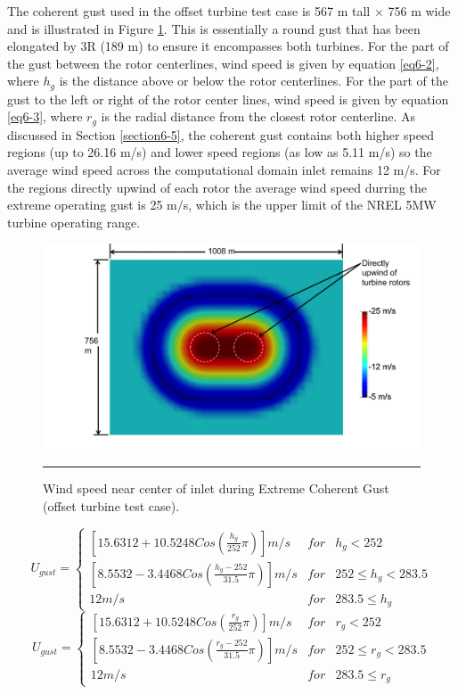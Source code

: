 The coherent gust used in the offset turbine test case is 567 m tall $\times$ 756 m wide and is illustrated in Figure \ref{fig6-13}. This is essentially a round gust that has been elongated by 3R (189 m) to ensure it encompasses both turbines. For the part of the gust between the rotor centerlines,  wind speed is given by equation \ref{eq6-2}, where $h_g$ is the distance above or below the rotor centerlines. For the part of the gust to the left or right of the rotor center lines, wind speed is given by equation \ref{eq6-3}, where $r_g$ is the radial distance from the closest rotor centerline. As discussed in Section \ref{section6-5}, the coherent gust contains both higher speed regions (up to 26.16 m/s) and lower speed regions (as low as 5.11 m/s) so the average wind speed across the computational domain inlet remains 12 m/s. For the regions directly upwind of each rotor the average wind speed durring the extreme operating gust is 25 m/s, which is the upper limit of the NREL 5MW turbine operating range. 

\begin{figure}[htbp] \label{fig6-13} 
	\centering
		\includegraphics[width = \linewidth]{Figures/ch6Figures/fig6-13.png}
		\rule{35em}{0.5pt}
	\caption{Wind speed near center of inlet during Extreme Coherent Gust (offset turbine test case).}
\end{figure}

\begin{equation} \label{eq6-2}
	U_{gust}=\left\{\begin{matrix}
\left [15.6312 +10.5248Cos\left ( \frac{h_g}{252 }\pi  \right )  \right ]m/s & for  & h_g<252\\ 
 \left [8.5532 -3.4468Cos\left ( \frac{h_g-252}{31.5}\pi  \right )  \right ]m/s & for  & 252 \leq h_g <283.5\\ 
 12 m/s &  for & 283.5 \leq h_g
\end{matrix}\right. 
\end{equation}
\begin{equation} \label{eq6-3}
	U_{gust}=\left\{\begin{matrix}
\left [15.6312 +10.5248Cos\left ( \frac{r_g}{252 }\pi  \right )  \right ]m/s & for  & r_g<252\\ 
 \left [8.5532 -3.4468Cos\left ( \frac{r_g-252}{31.5}\pi  \right )  \right ]m/s & for  & 252 \leq r_g <283.5\\ 
 12 m/s &  for & 283.5 \leq r_g
\end{matrix}\right. 
\end{equation}

